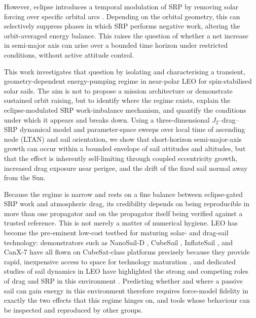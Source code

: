 \vspace{0.5em}
\par\noindent However, eclipse introduces a temporal modulation of SRP by removing solar forcing over specific orbital arcs \citep{hubaux2013shadow}. Depending on the orbital geometry, this can selectively suppress phases in which SRP performs negative work, altering the orbit-averaged energy balance. This raises the question of whether a net increase in semi-major axis can arise over a bounded time horizon under restricted conditions, without active attitude control.

\vspace{0.5em}
\par\noindent This work investigates that question by isolating and characterising a transient, geometry-dependent energy-pumping regime in near-polar LEO for spin-stabilised solar sails. The aim is not to propose a mission architecture or demonstrate sustained orbit raising, but to identify where the regime exists, explain the eclipse-modulated SRP work-imbalance mechanism, and quantify the conditions under which it appears and breaks down. Using a three-dimensional \(J_2\)--drag--SRP dynamical model and parameter-space sweeps over local time of ascending node (LTAN) and sail orientation, we show that short-horizon semi-major-axis growth can occur within a bounded envelope of sail attitudes and altitudes, but that the effect is inherently self-limiting through coupled eccentricity growth, increased drag exposure near perigee, and the drift of the fixed sail normal away from the Sun.

\vspace{0.5em}
\par\noindent Because the regime is narrow and rests on a fine balance between eclipse-gated SRP work and atmospheric drag, its credibility depends on being reproducible in more than one propagator and on the propagator itself being verified against a trusted reference. This is not merely a matter of numerical hygiene. LEO has become the pre-eminent low-cost testbed for maturing solar- and drag-sail technology: demonstrators such as NanoSail-D \citep{johnsonNanoSailD2011}, CubeSail \citep{lappasCubeSail2011}, InflateSail \citep{underwoodInflateSail2019}, and CanX-7 \citep{boninCanX72013} have all flown on CubeSat-class platforms precisely because they provide rapid, inexpensive access to space for technology maturation \citep{selvaCubeSatSurvey2012,woellertCubeSatCost2011}, and dedicated studies of sail dynamics in LEO have highlighted the strong and competing roles of drag and SRP in this environment \citep{firuziSolarSailLEO2018,deiuliisRadiationPressure2021}. Predicting whether and where a passive sail can gain energy in this environment therefore requires force-model fidelity in exactly the two effects that this regime hinges on, and tools whose behaviour can be inspected and reproduced by other groups.

